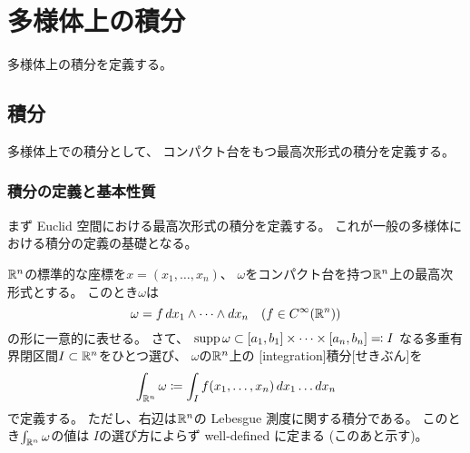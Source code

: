 \documentclass[report]{jlreq}
\begin{document}
\begin{answer}
    \TODO{}
\end{answer}



%
\chapter{多様体上の積分}

多様体上の積分を定義する。

%
\section{積分}

多様体上での積分として、
コンパクト台をもつ最高次形式の積分を定義する。

\subsection{積分の定義と基本性質}

まず Euclid 空間における最高次形式の積分を定義する。
これが一般の多様体における積分の定義の基礎となる。

\begin{definition}
    $\mathbb{R}^n$の標準的な座標を$x = (x_1, \dots, x_n)$、
    $\omega$をコンパクト台を持つ$\mathbb{R}^n$上の最高次形式とする。
    このとき$\omega$は
    \begin{equation}
        \omega = f \, dx_1 \wedge \dots \wedge dx_n
            \quad
            (f \in C^\infty(\mathbb{R}^n))
    \end{equation}
    の形に一意的に表せる。
    さて、
    $\operatorname{supp} \omega
        \subset [a_1, b_1] \times \dots \times [a_n, b_n]
        \eqqcolon I$
    なる多重有界閉区間$I \subset \mathbb{R}^n$をひとつ選び、
    $\omega$の$\mathbb{R}^n$上の
    [integration]{積分}[せきぶん]を
    \begin{equation}
        \int_{\mathbb{R}^n} \omega
            \coloneqq
            \int_I f(x_1, \dots, x_n) \, dx_1 \dots dx_n
    \end{equation}
    で定義する。
    ただし、右辺は$\mathbb{R}^n$の Lebesgue 測度に関する積分である。
    このとき$\int_{\mathbb{R}^n} \omega$の値は
    $I$の選び方によらず well-defined に定まる (このあと示す)。
\end{definition}
\end{document}
